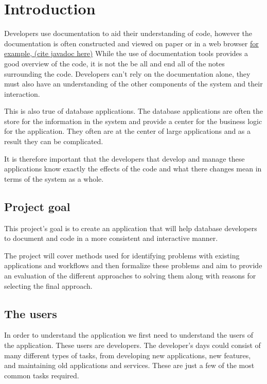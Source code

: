 \chapter{Introduction}\label{introduction}

Developers use documentation to aid their understanding of code, however
the documentation is often constructed and viewed on paper or in a web
browser
\href{http://www.oracle.com/technetwork/articles/java/index-jsp-135444.html}{for
example, (cite javadoc here)} While the use of documentation tools
provides a good overview of the code, it is not the be all and end all
of the notes surrounding the code. Developers can't rely on the
documentation alone, they must also have an understanding of the other
components of the system and their interaction.

This is also true of database applications. The database applications
are often the store for the information in the system and provide a
center for the business logic for the application. They often are at the
center of large applications and as a result they can be complicated.

It is therefore important that the developers that develop and manage
these applications know exactly the effects of the code and what there
changes mean in terms of the system as a whole.

\section{Project goal}\label{project-goal}

This project's goal is to create an application that will help database
developers to document and code in a more consistent and interactive
manner.

The project will cover methods used for identifying problems with
existing applications and workflows and then formalize these problems
and aim to provide an evaluation of the different approaches to solving
them along with reasons for selecting the final approach.

\section{The users}\label{the-users}

In order to understand the application we first need to understand the
users of the application. These users are developers. The developer's
days could consist of many different types of tasks, from developing new
applications, new features, and maintaining old applications and
services. These are just a few of the most common tasks required.

